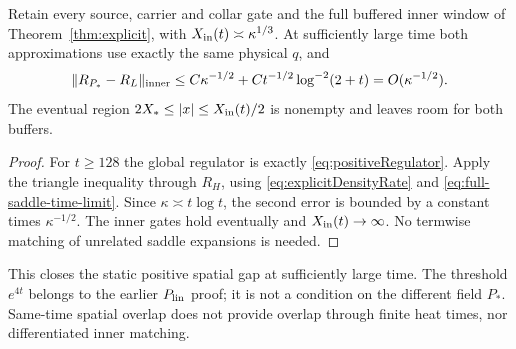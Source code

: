\begin{corollary}\label{cor:inner-static-overlap}
Retain every source, carrier and collar gate and the full buffered inner
window of Theorem~\ref{thm:explicit}, with
$X_{\rm in}(t)\asymp\kappa^{1/3}$.
At sufficiently large time both approximations use exactly the same
physical $q$, and
\begin{equation}
 \|R_{P_*}-R_L\|_{\rm inner}
 \le C\kappa^{-1/2}+Ct^{-1/2}\log^{-2}(2+t)
 =O(\kappa^{-1/2}).
 \label{eq:full-saddle-inner-overlap}
\end{equation}
The eventual region $2X_*\le|x|\le X_{\rm in}(t)/2$ is nonempty
and leaves room for both buffers.
\end{corollary}
\begin{proof}
For $t\ge128$ the global regulator is exactly
\eqref{eq:positiveRegulator}. Apply the triangle inequality through
$R_H$, using \eqref{eq:explicitDensityRate} and
\eqref{eq:full-saddle-time-limit}. Since $\kappa\asymp t\log t$,
the second error is bounded by a constant times $\kappa^{-1/2}$.
The inner gates hold eventually and $X_{\rm in}(t)\to\infty$.
No termwise matching of unrelated saddle expansions is needed.
\end{proof}
This closes the static positive spatial gap at sufficiently large time.
The threshold $e^{4t}$ belongs to the earlier $P_{\rm lin}$ proof;
it is not a condition on the different field $P_*$.
Same-time spatial overlap does not provide overlap through finite heat
times, nor differentiated inner matching.

